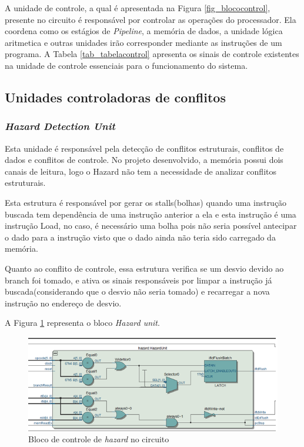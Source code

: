 \documentclass[
	11pt,				%
	openany,			%
	oneside,
	a4paper,			%
	chapter=TITLE,		%
	section=TITLE,		%
	english,			%
	brazil				%
	]{abntex2}
\begin{document}
A unidade de controle, a qual é apresentada na Figura \ref{fig_blococontrol}, presente no circuito é responsável por controlar as operações do processador. Ela coordena como os estágios de \textit{Pipeline}, a memória de dados, a unidade lógica aritmetica e outras unidades irão corresponder mediante as instruções de um programa. A Tabela \ref{tab_tabelacontrol} apresenta os sinais de controle existentes na unidade de controle essenciais para o funcionamento do sistema.

\subsection{Unidades controladoras de conflitos}
\subsubsection{\textit{Hazard Detection Unit}}


Esta unidade é responsável pela detecção de conflitos estruturais, conflitos de dados e conflitos de controle. No projeto desenvolvido, a memória possui dois canais de leitura, logo o Hazard não tem a necessidade de analizar conflitos estruturais.

	Esta estrutura é responsável por gerar os stalls(bolhas) quando uma instrução buscada tem dependência de uma instrução anterior a ela e esta instrução é uma instrução Load, no caso, é necessário uma bolha pois não seria possível antecipar o dado para a instrução visto que o dado ainda não teria sido carregado da memória.
    
    Quanto ao conflito de controle, essa estrutura verifica se um desvio devido ao branch foi tomado, e ativa os sinais responsáveis por limpar a instrução já buscada(considerando que o desvio não seria tomado) e recarregar a nova instrução no endereço de desvio.
    
    A Figura \ref{fig_blocohazard} representa o bloco \textit{Hazard unit}.

\begin{figure}[H]
	\caption{\label{fig_blocohazard}Bloco de controle de \textit{hazard} no circuito}
	\begin{center}
	    \includegraphics[scale=0.7]{hazardunit.png}
	\end{center}
\end{figure}
\end{document}
